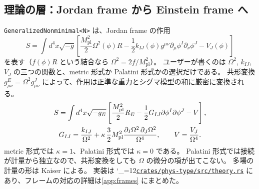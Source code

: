 \documentclass[a4paper,11pt]{ltjsarticle}
\newcommand{\Mpl}{M_{\mathrm{pl}}}
\newcommand{\fnl}{f_{\mathrm{NL}}}
\newcommand{\code}[1]{\texttt{#1}}
\newcommand{\repourl}{https://github.com/inuverse44/phys-type-dev}
\newcommand{\reporev}{b1fea87}
\newcommand{\repo}{\begingroup\catcode`\_=12\relax\repoaux}
\newcommand{\repoaux}[1]{\href{\repourl/blob/\reporev/#1}{\nolinkurl{#1}}\endgroup}
\begin{document}
\begin{center}
\end{center}

\subsection{理論の層：Jordan frame から Einstein frame へ}
\label{sec:theory}

\code{GeneralizedNonminimal<N>} は、Jordan frame の作用
\begin{equation}
S=\int d^4x\sqrt{-g}\left[\frac{\Mpl^2}{2}\Omega^2(\phi)R-\frac12k_{IJ}(\phi)g^{\mu\nu}\partial_\mu\phi^I\partial_\nu\phi^J-V_J(\phi)\right]
\label{eq:jordan}
\end{equation}
を表す（$f(\phi)R$ という結合なら $\Omega^2=2f/\Mpl^2$）。
ユーザーが書くのは $\Omega^2$, $k_{IJ}$, $V_J$ の三つの関数と、metric 形式か Palatini 形式かの選択だけである。
共形変換 $g^E_{\mu\nu}=\Omega^2g^J_{\mu\nu}$ によって、作用は正準な重力とシグマ模型の和に厳密に変換される。
\begin{gather}
S=\int d^4x\sqrt{-g_E}\left[\frac{\Mpl^2}{2}R_E-\frac12G_{IJ}\partial\phi^I\partial\phi^J-V\right],\notag\\
G_{IJ}=\frac{k_{IJ}}{\Omega^2}+\kappa\,\frac32\Mpl^2\frac{\partial_I\Omega^2\,\partial_J\Omega^2}{\Omega^4},\qquad
V=\frac{V_J}{\Omega^4}.
\label{eq:einstein}
\end{gather}
metric 形式では $\kappa=1$、Palatini 形式では $\kappa=0$ である。
Palatini 形式では接続が計量から独立なので、共形変換をしても $\Omega$ の微分の項が出てこない\cite{BauerDemir2008}。
多場の計量の形は Kaiser\cite{Kaiser2010} による。
実装は \repo{crates/phys-type/src/theory.rs} にあり、フレームの対応の詳細は\ref{app:frames} にまとめた。
\end{document}
